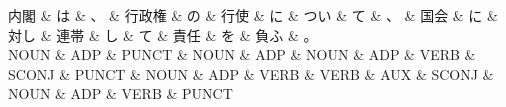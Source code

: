 \documentclass[tikz,border=5pt]{standalone}
\begin{document}
\normalsize
\begin{dependency}[edge unit distance=12.0pt]
    \begin{deptext}[column sep=1em]
        内閣 \& は \& 、 \& 行政権 \& の \& 行使 \& に \& つい \& て \& 、 \& 国会 \& に \& 対し \& 連帯 \& し \& て \& 責任 \& を \& 負ふ \& 。\\
        NOUN \& ADP \& PUNCT \& NOUN \& ADP \& NOUN \& ADP \& VERB \& SCONJ \& PUNCT \& NOUN \& ADP \& VERB \& VERB \& AUX \& SCONJ \& NOUN \& ADP \& VERB \& PUNCT\\
    \end{deptext}
\end{dependency}
\end{document}
